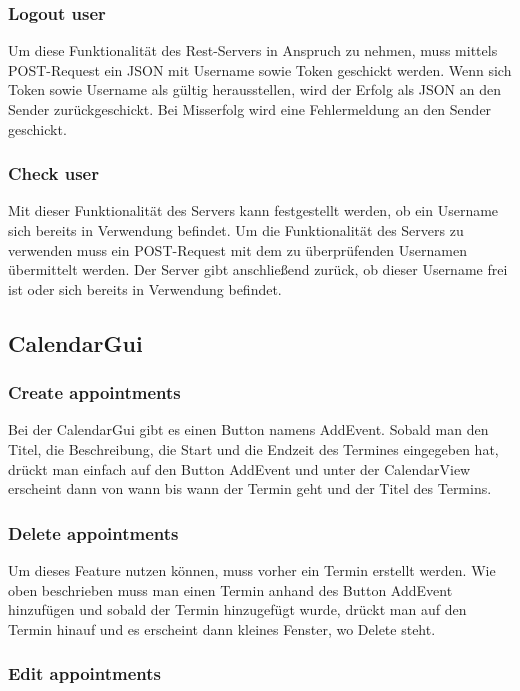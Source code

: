 \documentclass[12pt]{scrartcl}
\begin{document}
    \subsubsection{Logout user}
        Um diese Funktionalität des Rest-Servers in Anspruch zu nehmen, muss mittels POST-Request ein JSON mit Username 
        sowie Token geschickt werden. Wenn sich Token sowie Username als gültig herausstellen, wird 
        der Erfolg als JSON an den Sender zurückgeschickt. Bei Misserfolg wird eine Fehlermeldung an den Sender 
        geschickt.
    \subsubsection{Check user}
        Mit dieser Funktionalität des Servers kann festgestellt werden, ob ein Username sich bereits in Verwendung 
        befindet. Um die Funktionalität des Servers zu verwenden muss ein POST-Request mit dem zu überprüfenden 
        Usernamen übermittelt werden.
        Der Server gibt anschließend zurück, ob dieser Username frei ist oder sich bereits in Verwendung befindet.

    \subsection{CalendarGui}
    \subsubsection{Create appointments}
        Bei der CalendarGui gibt es einen Button namens AddEvent. Sobald man den Titel, die Beschreibung, die Start und
        die Endzeit des Termines eingegeben hat, drückt man einfach auf den Button AddEvent und unter der CalendarView erscheint
        dann von wann bis wann der Termin geht und der Titel des Termins.
        
    \subsubsection{Delete appointments}
        Um dieses Feature nutzen können, muss vorher ein Termin erstellt werden. Wie oben beschrieben muss man einen Termin
        anhand des Button AddEvent hinzufügen und sobald der Termin hinzugefügt wurde, drückt man auf den Termin hinauf und
        es erscheint dann kleines Fenster, wo Delete steht.    
        
    \subsubsection{Edit appointments}
            
\end{document}
